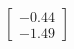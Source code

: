 \documentclass[preview]{standalone}
\begin{document}
\begin{align*}
\begin{bmatrix} -0.44 \\ -1.49 \end{bmatrix}
\end{align*}
\end{document}
